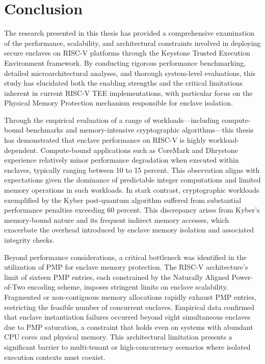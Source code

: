 \chapter{Conclusion}
\label{chap:conclusion}

The research presented in this thesis has provided a comprehensive examination of the performance, scalability, and architectural constraints involved in deploying secure enclaves on RISC-V platforms through the Keystone Trusted Execution Environment framework. By conducting rigorous performance benchmarking, detailed microarchitectural analyses, and thorough system-level evaluations, this study has elucidated both the enabling strengths and the critical limitations inherent in current RISC-V TEE implementations, with particular focus on the Physical Memory Protection mechanism responsible for enclave isolation.

Through the empirical evaluation of a range of workloads—including compute-bound benchmarks and memory-intensive cryptographic algorithms—this thesis has demonstrated that enclave performance on RISC-V is highly workload-dependent. Compute-bound applications such as CoreMark and Dhrystone experience relatively minor performance degradation when executed within enclaves, typically ranging between 10 to 15 percent. This observation aligns with expectations given the dominance of predictable integer computations and limited memory operations in such workloads. In stark contrast, cryptographic workloads exemplified by the Kyber post-quantum algorithm suffered from substantial performance penalties exceeding 60 percent. This discrepancy arises from Kyber's memory-bound nature and its frequent indirect memory accesses, which exacerbate the overhead introduced by enclave memory isolation and associated integrity checks.

Beyond performance considerations, a critical bottleneck was identified in the utilization of PMP for enclave memory protection. The RISC-V architecture’s limit of sixteen PMP entries, each constrained by the Naturally Aligned Power-of-Two encoding scheme, imposes stringent limits on enclave scalability. Fragmented or non-contiguous memory allocations rapidly exhaust PMP entries, restricting the feasible number of concurrent enclaves. Empirical data confirmed that enclave instantiation failures occurred beyond eight simultaneous enclaves due to PMP saturation, a constraint that holds even on systems with abundant CPU cores and physical memory. This architectural limitation presents a significant barrier to multi-tenant or high-concurrency scenarios where isolated execution contexts must coexist.

